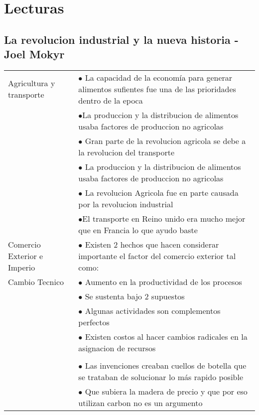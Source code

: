 \section{Lecturas}
\subsection{La revolucion industrial y la nueva historia - Joel Mokyr}

\begingroup
\setlength{\tabcolsep}{12pt} %
\renewcommand{\arraystretch}{1.5} %
\begin{tabular}{lp{11cm}}
  Agricultura y transporte    & $\bullet$ La capacidad de la economía para generar alimentos sufientes fue una de las prioridades dentro de la epoca \\
                              & $\bullet$La produccion y la distribucion de alimentos usaba factores de produccion no agricolas                      \\
                              & $\bullet$ Gran parte de la revolucion agricola se debe a la revolucion del transporte                                \\
                              & $\bullet$ La produccion y la distribucion de alimentos usaba factores de produccion no agricolas                     \\
                              & $\bullet$ La revolucion Agricola fue en parte causada por la revolucion industrial                                   \\
                              & $\bullet$El transporte en Reino unido era mucho mejor que en Francia lo que ayudo baste                              \\ \hline
  Comercio Exterior e Imperio & $\bullet$ Existen 2 hechos que hacen considerar importante el factor del comercio exterior tal como:                 \\ \hline
  Cambio Tecnico              & $\bullet$ Aumento en la productividad de los procesos                                                                \\
                              & $\bullet$ Se sustenta bajo 2 supuestos                                                                               \\
                              & \hspace{1cm}$\bullet$ Algunas actividades son complementos perfectos                                                 \\ \vspace{-0.7cm}
                              & \hspace{1cm} $\bullet$ Existen costos al hacer cambios radicales en la asignacion de recursos                        \\                                                                                  \\
                              & $\bullet$ Las invenciones creaban cuellos de botella que se trataban de solucionar lo más rapido posible             \\
                              & $\bullet$ Que subiera la madera de precio y que por eso utilizan carbon no es un argumento
\end{tabular}
\endgroup
